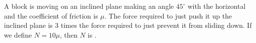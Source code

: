 
\item A block is moving on an inclined plane making an angle \(45^\circ\) with the horizontal and the coefficient of friction is \(\mu\). The force required to just push it up the inclined plane is 3 times the force required to just prevent it from sliding down. If we define \(N = 10 \mu\), then \(N\) is \underline{\hspace{2.5cm}}.
